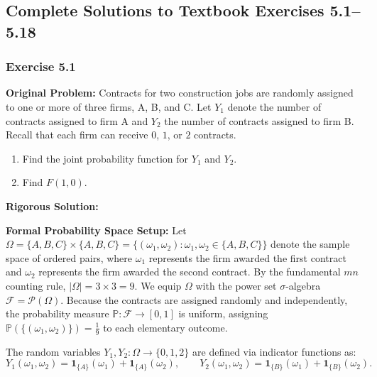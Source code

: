 \documentclass[11pt, letterpaper]{article}
\theoremstyle{definition}
\theoremstyle{remark}
\begin{document}
\newpage

\subsection{Complete Solutions to Textbook Exercises 5.1--5.18}

\subsubsection*{Exercise 5.1}
\textbf{Original Problem:} Contracts for two construction jobs are randomly assigned to one or more of three firms, A, B, and C. Let $Y_1$ denote the number of contracts assigned to firm A and $Y_2$ the number of contracts assigned to firm B. Recall that each firm can receive $0$, $1$, or $2$ contracts.
\begin{enumerate}[label=\textbf{\alph*}]
    \item Find the joint probability function for $Y_1$ and $Y_2$.
    \item Find $F(1, 0)$.
\end{enumerate}

\textbf{Rigorous Solution:}

\textbf{Formal Probability Space Setup:} Let $\Omega = \{A, B, C\} \times \{A, B, C\} = \{(\omega_1, \omega_2) : \omega_1, \omega_2 \in \{A, B, C\}\}$ denote the sample space of ordered pairs, where $\omega_1$ represents the firm awarded the first contract and $\omega_2$ represents the firm awarded the second contract. By the fundamental $mn$ counting rule, $|\Omega| = 3 \times 3 = 9$. We equip $\Omega$ with the power set $\sigma$-algebra $\mathcal{F} = \mathcal{P}(\Omega)$. Because the contracts are assigned randomly and independently, the probability measure $\mathbb{P} : \mathcal{F} \to [0, 1]$ is uniform, assigning $\mathbb{P}(\{(\omega_1, \omega_2)\}) = \frac{1}{9}$ to each elementary outcome.

The random variables $Y_1, Y_2 : \Omega \to \{0, 1, 2\}$ are defined via indicator functions as:
\[
    Y_1(\omega_1, \omega_2) = \mathbf{1}_{\{A\}}(\omega_1) + \mathbf{1}_{\{A\}}(\omega_2), \qquad Y_2(\omega_1, \omega_2) = \mathbf{1}_{\{B\}}(\omega_1) + \mathbf{1}_{\{B\}}(\omega_2).
\]
\end{document}
